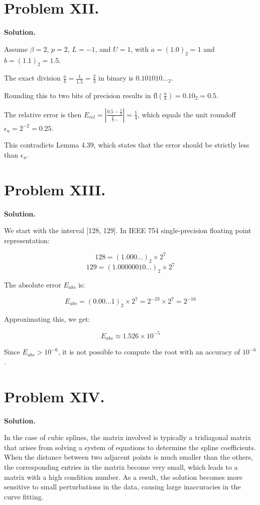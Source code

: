 \documentclass[a4paper]{article}
\begin{document}
\section*{Problem XII.}

\textbf{Solution.}

Assume \(\beta = 2\), \(p = 2\), \(L = -1\), and \(U = 1\), with \(a = (1.0)_2 = 1\) and \(b = (1.1)_2 = 1.5\). 

The exact division \(\frac{a}{b} = \frac{1}{1.5} = \frac{2}{3}\) in binary is \(0.101010\ldots_2\). 

Rounding this to two bits of precision results in \( \text{fl}\left( \frac{a}{b} \right) = 0.10_2 = 0.5 \). 

The relative error is then \( E_{rel} = \left| \frac{0.5 - \frac{2}{3}}{\frac{2}{3}\ldots} \right| = \frac{1}{4} \), which equals the unit roundoff \(\epsilon_u = 2^{-2} = 0.25\). 

This contradicts Lemma 4.39, which states that the error should be strictly less than \( \epsilon_u \).


\section*{Problem XIII.}

\textbf{Solution.}

We start with the interval [128, 129]. In IEEE 754 single-precision floating point representation:

\[
128 = (1.000\ldots)_2 \times 2^7
\]
\[
129 = (1.00000010\ldots)_2 \times 2^7
\]

The absolute error \(E_{abs}\) is:

\[
E_{abs} = (0.00\ldots1)_2 \times 2^7 = 2^{-23} \times 2^7 = 2^{-16}
\]

Approximating this, we get:

\[
E_{abs} \approx 1.526 \times 10^{-5}
\]

Since \(E_{abs} > 10^{-6}\), it is not possible to compute the root with an accuracy of \(10^{-6}\).




\section*{Problem XIV.}

\textbf{Solution.}

In the case of cubic splines, the matrix involved is typically a tridiagonal matrix that arises from solving a system of equations to determine the spline coefficients. When the distance between two adjacent points is much smaller than the others, the corresponding entries in the matrix become very small, which leads to a matrix with a high condition number. As a result, the solution becomes more sensitive to small perturbations in the data, causing large inaccuracies in the curve fitting.
\end{document}

